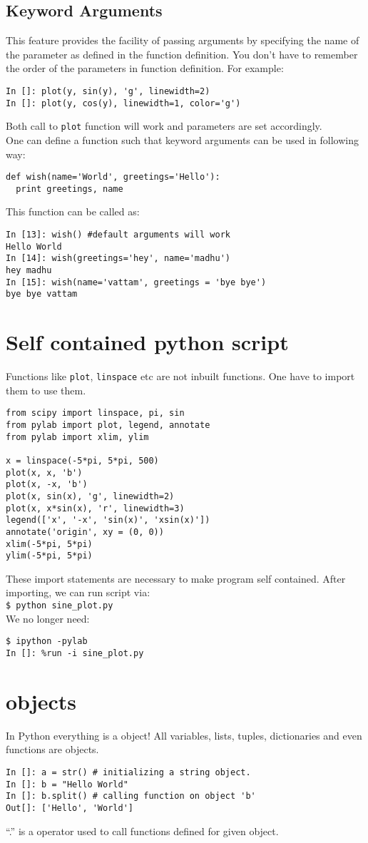 \documentclass[12pt]{article}
\newcommand{\typ}[1]{\lstinline{#1}}
\begin{document}
\subsection{Keyword Arguments}
This feature provides the facility of passing arguments by specifying the name of the parameter as defined in the function definition. You don't have to remember the order of the parameters in function definition. For example:
\begin{lstlisting}
In []: plot(y, sin(y), 'g', linewidth=2)
In []: plot(y, cos(y), linewidth=1, color='g')
\end{lstlisting}
Both call to \typ{plot} function will work and parameters are set accordingly.\\
One can define a function such that keyword arguments can be used in following way:
\begin{lstlisting}
def wish(name='World', greetings='Hello'):
  print greetings, name
\end{lstlisting}
This function can be called as:
\begin{lstlisting}
In [13]: wish() #default arguments will work
Hello World
In [14]: wish(greetings='hey', name='madhu')
hey madhu
In [15]: wish(name='vattam', greetings = 'bye bye')
bye bye vattam
\end{lstlisting}
\section{Self contained python script}
Functions like \typ{plot}, \typ{linspace} etc are not inbuilt functions. One have to import them to use them.
  \begin{lstlisting}
from scipy import linspace, pi, sin
from pylab import plot, legend, annotate
from pylab import xlim, ylim

x = linspace(-5*pi, 5*pi, 500)
plot(x, x, 'b')
plot(x, -x, 'b')
plot(x, sin(x), 'g', linewidth=2)
plot(x, x*sin(x), 'r', linewidth=3)
legend(['x', '-x', 'sin(x)', 'xsin(x)'])
annotate('origin', xy = (0, 0))
xlim(-5*pi, 5*pi)
ylim(-5*pi, 5*pi)
  \end{lstlisting}
These import statements are necessary to make program self contained. After importing, we can run script via:\\
\typ{$ python sine_plot.py} \\ %
We no longer need:
\begin{lstlisting}
$ ipython -pylab
In []: %run -i sine_plot.py
\end{lstlisting} %
\section{objects}
In Python everything is a object! All variables, lists, tuples, dictionaries and even functions are objects. 
\begin{lstlisting}
In []: a = str() # initializing a string object.
In []: b = "Hello World"
In []: b.split() # calling function on object 'b'
Out[]: ['Hello', 'World']
\end{lstlisting}
``.'' is a operator used to call functions defined for given object.
\end{document}

